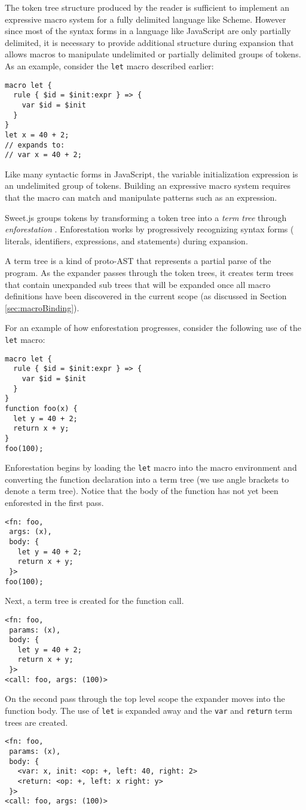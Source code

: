 \documentclass[preprint,10pt]{sigplanconf}
\begin{document}
The token tree structure produced by the reader is sufficient to
implement an expressive macro system for a fully delimited language
like Scheme. However since most of the syntax forms in a language like
JavaScript are only partially delimited, it is necessary to provide
additional structure during expansion that allows macros to manipulate
undelimited or partially delimited groups of tokens. As an example,
consider the \verb!let! macro described earlier:

\begin{lstlisting}
macro let {
  rule { $id = $init:expr } => {
    var $id = $init
  }
}
let x = 40 + 2;
// expands to:
// var x = 40 + 2;
\end{lstlisting}

Like many syntactic forms in JavaScript, the variable initialization
expression is an undelimited group of tokens. Building an expressive
macro system requires that the macro can match and manipulate patterns
such as an expression.

Sweet.js groups tokens by
transforming a token tree into a
\emph{term tree} through \emph{enforestation} \cite{Rafkind2013}.
Enforestation works by progressively recognizing syntax forms (\eg
literals, identifiers, expressions, and statements) during expansion.

A term tree is a kind of proto-AST that represents a partial parse of
the program. As the expander passes through the token trees, it
creates term trees that contain unexpanded sub trees that will be
expanded once all macro definitions have been discovered in the
current scope (as discussed in Section \ref{sec:macroBinding}).

For an example of how enforestation progresses, consider the following
use of the \verb!let! macro:
\begin{lstlisting}
macro let {
  rule { $id = $init:expr } => {
    var $id = $init
  }
}
function foo(x) {
  let y = 40 + 2;
  return x + y;
}
foo(100);
\end{lstlisting}
Enforestation begins by loading the \verb!let! macro into the
macro environment and converting the function declaration into a term
tree (we use angle brackets to denote a term tree). Notice that the
body of the function has not yet been enforested in the first pass.
\begin{lstlisting}
<fn: foo, 
 args: (x), 
 body: {
   let y = 40 + 2;
   return x + y;
 }>
foo(100);
\end{lstlisting}
Next, a term tree is created for the function call.
\begin{lstlisting}
<fn: foo, 
 params: (x), 
 body: {
   let y = 40 + 2;
   return x + y;
 }>
<call: foo, args: (100)>
\end{lstlisting}
On the second pass through the top level scope the expander moves into
the function body. The use of \verb!let! is expanded away and the
\verb!var! and \verb!return! term trees are created.
\begin{lstlisting}
<fn: foo, 
 params: (x), 
 body: {
   <var: x, init: <op: +, left: 40, right: 2>
   <return: <op: +, left: x right: y> 
 }>
<call: foo, args: (100)>
\end{lstlisting}
\end{document}

